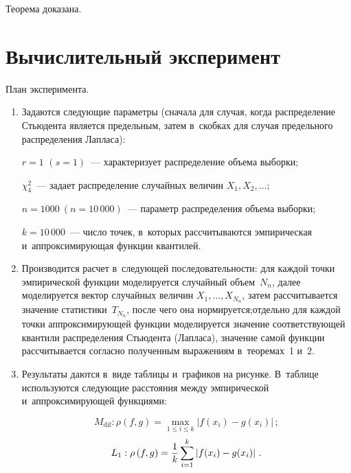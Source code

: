\begin{multicols}{2}
\vspace*{-6pt}

\noindent
Теорема доказана.

\vspace*{-6pt}

\section{Вычислительный эксперимент}


План эксперимента.
\begin{enumerate}[1.]
    \item   Задаются следующие параметры (сначала для случая, 
    когда распределение Стьюдента является предельным, затем в~скобках 
    для случая предельного распределения Лапласа): 

        $r =1$ $(s=1)$~--- характеризует распределение объема выборки; 

        $\chi^{2}_{4}$~--- задает распределение случайных величин $X_1,X_2,\ldots$; 

        $n = 1000 \:(n = 10\,000)$~--- параметр распределения объема выборки;

        $k = 10\,000$~--- число точек, в~которых рассчитываются эмпирическая 
        и~аппроксимирующая функции квантилей.
    \item   Производится расчет в~следующей последовательности: для каждой точки 
    эмпирической функции моделируется случайный объем~$N_n$, далее моделируется 
    вектор случайных величин $X_1,\ldots,X_{N_n}$, затем рассчитывается значение 
    статистики~$T_{N_n}$, после чего она нормируется;\linebreak отдельно для каж\-дой точ\-ки 
    ап\-прок\-си\-ми\-ру\-ющей функции моделируется значение соответствующей квантили 
    распределения Стью\-ден\-та (Лапласа), значение самой функции рассчитыва\-ется 
    согласно полученным выражениям в~теоремах~1 и~2.
    \item   Результаты даются в~виде таблицы и~графиков на рисунке. 
    В~таблице используются следу\-ющие расстояния  между эмпирической и~аппроксимирующей 
    функциями:
    
    \noindent
            $$
        M_{\mathrm{dif}}: \rho\left(f,g\right)=\max\limits_{1\leq i\leq k}
        \left|f(x_i)-g(x_i)\right|\,; 
        $$
        $$
        L_{1}:  \rho\left(f,g\right)=
        \displaystyle\frac{\displaystyle 1\mathstrut}{\displaystyle k\mathstrut}\sum\limits_{i=1}^k\left|f(x_i)-g(x_i)\right|\,.
        $$
\end{enumerate}



\end{multicols}
